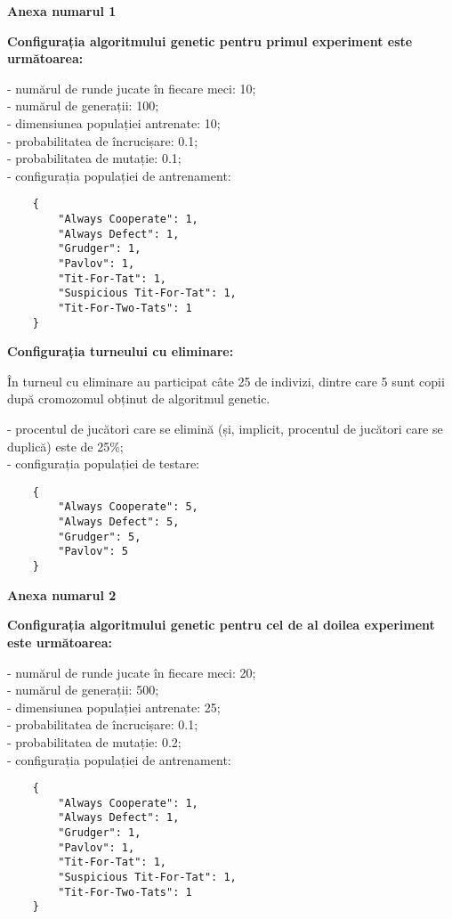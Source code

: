 \begin{center}
	\textbf{Anexa numarul 1}
\end{center}

\textbf{Configurația algoritmului genetic pentru primul experiment este următoarea: }

- numărul de runde jucate în fiecare meci: 10;\\
- numărul de generații: 100;\\
- dimensiunea populației antrenate: 10;\\
- probabilitatea de încrucișare: 0.1;\\
- probabilitatea de mutație: 0.1;\\
- configurația populației de antrenament:\\
\begin{center}
	\begin{lstlisting}
	{
		"Always Cooperate": 1,
		"Always Defect": 1,
		"Grudger": 1,
		"Pavlov": 1,
		"Tit-For-Tat": 1,
		"Suspicious Tit-For-Tat": 1,
		"Tit-For-Two-Tats": 1
	}
\end{lstlisting}
\end{center}
 
\textbf{Configurația turneului cu eliminare: }

În turneul cu eliminare au participat câte 25 de indivizi, dintre care 5 sunt copii după cromozomul obținut de algoritmul genetic. 

- procentul de jucători care se elimină (și, implicit, procentul de jucători care se duplică) este de 25\%;\\
- configurația populației de testare:\\
\begin{center}
	\begin{lstlisting}
	{
		"Always Cooperate": 5,
		"Always Defect": 5,
		"Grudger": 5,
		"Pavlov": 5
	}
	\end{lstlisting}
\end{center}

\clearpage

\begin{center}
	\textbf{Anexa numarul 2}
\end{center}

\textbf{Configurația algoritmului genetic pentru cel de al doilea experiment este următoarea: }

- numărul de runde jucate în fiecare meci: 20;\\
- numărul de generații: 500;\\
- dimensiunea populației antrenate: 25;\\
- probabilitatea de încrucișare: 0.1;\\
- probabilitatea de mutație: 0.2;\\
- configurația populației de antrenament:\\
\begin{center}
	\begin{lstlisting}
	{
		"Always Cooperate": 1,
		"Always Defect": 1,
		"Grudger": 1,
		"Pavlov": 1,
		"Tit-For-Tat": 1,
		"Suspicious Tit-For-Tat": 1,
		"Tit-For-Two-Tats": 1
	}
	\end{lstlisting}
\end{center}

